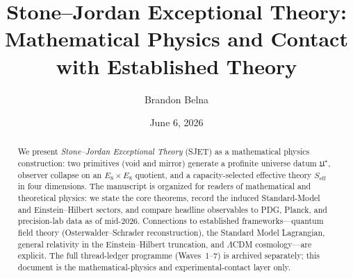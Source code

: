 \documentclass[11pt]{article}
\title{Stone--Jordan Exceptional Theory:\\[0.3em]
\large Mathematical Physics and Contact with Established Theory}
\author{Brandon Belna}
\date{June 6, 2026}
\theoremstyle{plain}
\theoremstyle{definition}
\theoremstyle{remark}
\numberwithin{equation}{section}
\begin{document}
\maketitle

\begin{abstract}
We present \emph{Stone--Jordan Exceptional Theory} (SJET) as a mathematical
physics construction: two primitives (void and mirror) generate a profinite
universe datum $\mathfrak{U}^\star$, observer collapse on an $E_8\times E_8$
quotient, and a capacity-selected effective theory $S_{\mathrm{eff}}$ in four
dimensions. The manuscript is organized for readers of mathematical and
theoretical physics: we state the core theorems, record the induced
Standard-Model and Einstein--Hilbert sectors, and compare headline observables
to PDG, Planck, and precision-lab data as of mid-2026. Connections to
established frameworks---quantum field theory (Osterwalder--Schrader
reconstruction), the Standard Model Lagrangian, general relativity in the
Einstein--Hilbert truncation, and $\Lambda$CDM cosmology---are explicit. The
full thread-ledger programme (Waves~1--7) is archived separately; this document
is the mathematical-physics and experimental-contact layer only.
\end{abstract}

\tableofcontents
\clearpage
\end{document}
